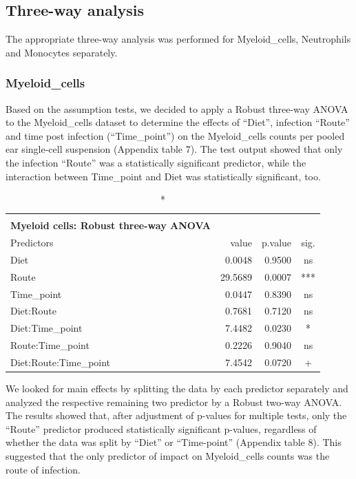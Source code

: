 \documentclass[
  12pt,
  letterpaper,
]{article}
\begin{document}
\subsection{Three-way analysis}\label{three-way-analysis}

The appropriate three-way analysis was performed for Myeloid\_cells, Neutrophils and Monocytes separately.

\subsubsection{Myeloid\_cells}\label{myeloid_cells-1}

Based on the assumption tests, we decided to apply a Robust three-way ANOVA to the Myeloid\_cells dataset to determine the effects of ``Diet'', infection ``Route'' and time post infection (``Time\_point'') on the Myeloid\_cells counts per pooled ear single-cell suspension (Appendix table 7). The test output showed that only the infection ``Route'' was a statistically significant predictor, while the interaction between Time\_point and Diet was statistically significant, too.

\begingroup
\fontsize{12.0pt}{14.4pt}\selectfont
\begin{longtable}{l|rrc}
\caption*{
{\large \textbf{Appendix Table 7}} \\ 
{\small \textbf{Myeloid cells: Robust three-way ANOVA}}
} \\ 
\toprule
Predictors & {value} & {p.value} & {sig.} \\ 
\midrule\addlinespace[2.5pt]
Diet & 0.0048 & 0.9500 & ns \\ 
Route & 29.5689 & 0.0007 & *** \\ 
Time\_point & 0.0447 & 0.8390 & ns \\ 
Diet:Route & 0.7681 & 0.7120 & ns \\ 
Diet:Time\_point & 7.4482 & 0.0230 & * \\ 
Route:Time\_point & 0.2226 & 0.9040 & ns \\ 
Diet:Route:Time\_point & 7.4542 & 0.0720 & + \\ 
\bottomrule
\end{longtable}
\endgroup

We looked for main effects by splitting the data by each predictor separately and analyzed the respective remaining two predictor by a Robust two-way ANOVA. The results showed that, after adjustment of p-values for multiple tests, only the ``Route'' predictor produced statistically significant p-values, regardless of whether the data was split by ``Diet'' or ``Time-point'' (Appendix table 8). This suggested that the only predictor of impact on Myeloid\_cells counts was the route of infection.
\end{document}
